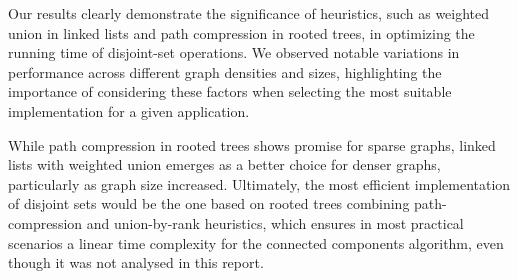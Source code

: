 \documentclass[11pt]{article}
\begin{document}
    Our results clearly demonstrate the significance of heuristics, such as weighted union in linked lists and path compression in rooted trees, in optimizing the running time of disjoint-set operations. We observed notable variations in performance across different graph densities and sizes, highlighting the importance of considering these factors when selecting the most suitable implementation for a given application.

    While path compression in rooted trees shows promise for sparse graphs, linked lists with weighted union emerges as a better choice for denser graphs, particularly as graph size increased. 
    Ultimately, the most efficient implementation of disjoint sets would be the one based on rooted trees combining path-compression and union-by-rank heuristics, which ensures in most practical scenarios a linear time complexity for the connected components algorithm, even though it was not analysed in this report.
    

    
    
    
    
    
    
    
\end{document}
